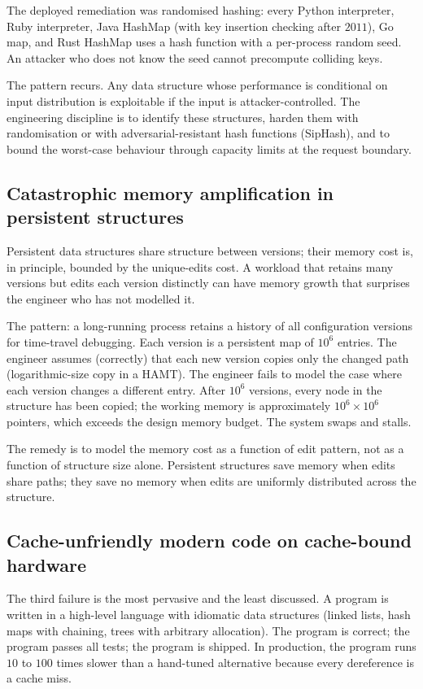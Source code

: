 The deployed remediation was randomised hashing: every Python interpreter, Ruby interpreter, Java HashMap (with key insertion checking after $2011$), Go map, and Rust HashMap uses a hash function with a per-process random seed. An attacker who does not know the seed cannot precompute colliding keys.

The pattern recurs. Any data structure whose performance is conditional on input distribution is exploitable if the input is attacker-controlled. The engineering discipline is to identify these structures, harden them with randomisation or with adversarial-resistant hash functions (SipHash), and to bound the worst-case behaviour through capacity limits at the request boundary.

\subsection{Catastrophic memory amplification in persistent structures}

Persistent data structures share structure between versions; their memory cost is, in principle, bounded by the unique-edits cost. A workload that retains many versions but edits each version distinctly can have memory growth that surprises the engineer who has not modelled it.

The pattern: a long-running process retains a history of all configuration versions for time-travel debugging. Each version is a persistent map of $10^6$ entries. The engineer assumes (correctly) that each new version copies only the changed path (logarithmic-size copy in a HAMT). The engineer fails to model the case where each version changes a different entry. After $10^6$ versions, every node in the structure has been copied; the working memory is approximately $10^6 \times 10^6$ pointers, which exceeds the design memory budget. The system swaps and stalls.

The remedy is to model the memory cost as a function of edit pattern, not as a function of structure size alone. Persistent structures save memory when edits share paths; they save no memory when edits are uniformly distributed across the structure.

\subsection{Cache-unfriendly modern code on cache-bound hardware}

The third failure is the most pervasive and the least discussed. A program is written in a high-level language with idiomatic data structures (linked lists, hash maps with chaining, trees with arbitrary allocation). The program is correct; the program passes all tests; the program is shipped. In production, the program runs $10$ to $100$ times slower than a hand-tuned alternative because every dereference is a cache miss.

